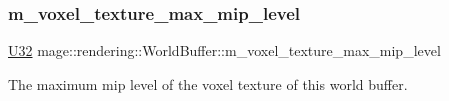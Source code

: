 \subsubsection{\texorpdfstring{m\+\_\+voxel\+\_\+texture\+\_\+max\+\_\+mip\+\_\+level}{m\_voxel\_texture\_max\_mip\_level}}
{\footnotesize\ttfamily \mbox{\hyperlink{namespacemage_a41c104c036fba3756a74e19f793eeaa1}{U32}} mage\+::rendering\+::\+World\+Buffer\+::m\+\_\+voxel\+\_\+texture\+\_\+max\+\_\+mip\+\_\+level}

The maximum mip level of the voxel texture of this world buffer. 